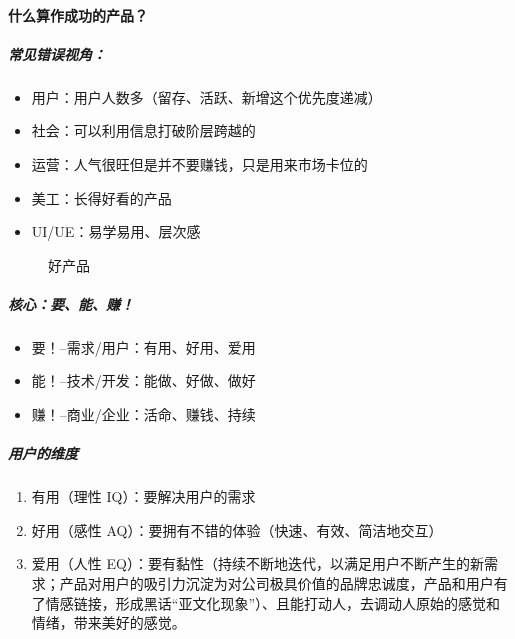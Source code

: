 \documentclass[letterpaper,10pt,english]{sphinxmanual}
\begin{document}
\paragraph{什么算作成功的产品？}
\label{\detokenize{chapter_introduction/Product:id4}}

\subparagraph{常见错误视角：}
\label{\detokenize{chapter_introduction/Product:id5}}\begin{itemize}
\item {} 
用户：用户人数多（留存、活跃、新增这个优先度递减）

\item {} 
社会：可以利用信息打破阶层跨越的

\item {} 
运营：人气很旺但是并不要赚钱，只是用来市场卡位的

\item {} 
美工：长得好看的产品

\item {} 
UI/UE：易学易用、层次感

\end{itemize}

\begin{figure}[H]
\centering
\capstart

\noindent{}
\caption{好产品}\label{\detokenize{chapter_introduction/Product:id54}}\end{figure}


\subparagraph{核心：要、能、赚！}
\label{\detokenize{chapter_introduction/Product:id6}}\begin{itemize}
\item {} 
要！–需求/用户：有用、好用、爱用

\item {} 
能！–技术/开发：能做、好做、做好

\item {} 
赚！–商业/企业：活命、赚钱、持续

\end{itemize}


\subparagraph{用户的维度}
\label{\detokenize{chapter_introduction/Product:id7}}\begin{enumerate}
%
\item {} 
有用（理性 IQ）：要解决用户的需求

\item {} 
好用（感性 AQ）：要拥有不错的体验（快速、有效、简洁地交互）

\item {} 
爱用（人性
EQ）：要有黏性（持续不断地迭代，以满足用户不断产生的新需求；产品对用户的吸引力沉淀为对公司极具价值的品牌忠诚度，产品和用户有了情感链接，形成黑话“亚文化现象”）、且能打动人，去调动人原始的感觉和情绪，带来美好的感觉。%
\begin{footnote}[39]\sphinxAtStartFootnote
{}
%
\end{footnote}

\end{enumerate}
\end{document}
